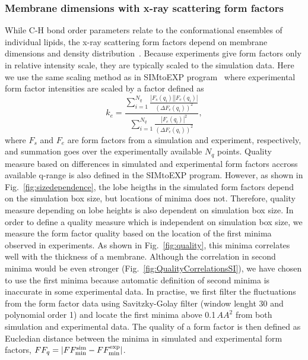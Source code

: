 \documentclass[fleqn,10pt]{wlscirep}
\begin{document}
\subsubsection{Membrane dimensions with x-ray scattering form factors}
While C-H bond order parameters relate to the conformational ensembles of individual lipids,
the x-ray scattering form factors depend on membrane dimensions and density distribution~\cite{ollila16}.
Because experiments give form factors only in relative intensity scale, they are typically scaled to the simulation data.
Here we use the same scaling method as in SIMtoEXP program~\cite{kucerka10} where experimental form factor intensities
are scaled by a factor defined as
\begin{equation}
    k_e = \frac{\sum_{i=1}^{N_q} \frac{|F_s(q_i)||F_e(q_i)|}{(\Delta F_e(q_i))^2}}{\sum_{i=1}^{N_q} \frac{|F_e(q_i)|^2}{(\Delta F_e(q_i))^2}},
\end{equation}
where $F_s$ and $F_e$ are form factors from a simulation and experiment, respectively, and summation goes over the experimentally available $N_q$ points. Quality measure based on differences in simulated and experimental form factors accross available q-range is also defined in the SIMtoEXP program. However, as shown in Fig.~\ref{fig:sizedependence}, the lobe heigths in the simulated form factors depend on the simulation box size, but locations of minima does not. Therefore, quality measure depending on lobe heights is also dependent on simulation box size. In order to define a quality measure which is independent on simulation box size, we measure the form factor quality based on the location of the first minima observed in experiments. As shown in Fig.~\ref{fig:quality}, this minima correlates well with the thickness of a membrane. Although the correlation in second minima would be even stronger (Fig.~\ref{fig:QualityCorrelationsSI}), we have chosen to use the first minima because automatic definition of second minima is inaccurate in some experimental data. In practise, we first filter the fluctuations from the form factor data using Savitzky-Golay filter (window lenght 30 and polynomial order 1) and locate the first minima above 0.1\,$AA^2$ from both simulation and experimental data. The quality of a form factor is then defined as Eucledian distance between the minima in simulated and experimental form factors, $FF_q = |FF_{\rm{min}}^{\rm{sim}}-FF_{\rm{min}}^{\rm{exp}}|$. 
\end{document}
